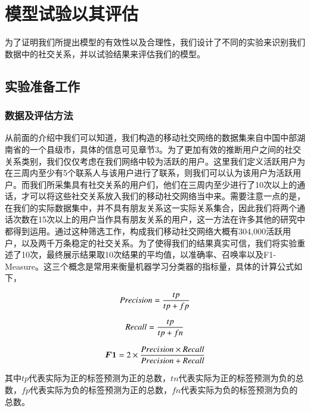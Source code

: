 \chapter{模型试验以其评估}

\qquad 为了证明我们所提出模型的有效性以及合理性，我们设计了不同的实验来识别我们数据中的社交关系，并以试验结果来评估我们的模型。

\section{实验准备工作}

\subsection{数据及评估方法}

从前面的介绍中我们可以知道，我们构造的移动社交网络的数据集来自中国中部湖南省的一个县级市，具体的信息可见章节3。为了更加有效的推断用户之间的社交关系类别，我们仅仅考虑在我们网络中较为活跃的用户。这里我们定义活跃用户为在三周内至少有5个联系人与该用户进行了联系，则我们可以认为该用户为活跃用户。而我们所采集具有社交关系的用户们，他们在三周内至少进行了10次以上的通话，才可以将这些社交关系放入我们的移动社交网络当中来。需要注意一点的是，在我们的实际数据集中，并不具有朋友关系这一实际关系集合，因此我们将两个通话次数在15次以上的用户当作具有朋友关系的用户，这一方法在许多其他的研究中都得到运用。通过这种筛选工作，构成我们移动社交网络大概有304,000活跃用户，以及两千万条稳定的社交关系。为了使得我们的结果真实可信，我们将实验重述了10次，最终展示结果取10次结果的平均值，以准确率、召唤率以及F1-Measure。这三个概念是常用来衡量机器学习分类器的指标量，具体的计算公式如下，

\begin{equation}
Precision = \frac{tp}{tp + fp} \\
\end{equation}

\begin{equation}
Recall = \frac{tp}{tp + fn} \\
\end{equation}

\begin{equation}
\bm{F1} = 2 \times \frac{Precision \times Recall}{Precision + Recall} \\
\end{equation}

其中$tp$代表实际为正的标签预测为正的总数，$tn$代表实际为正的标签预测为负的总数，$fp$代表实际为负的标签预测为正的总数，$fn$代表实际为负的标签预测为负的总数。 \\


